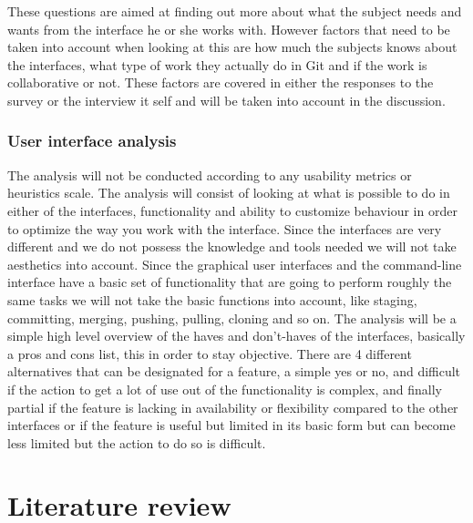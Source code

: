 \documentclass[a4paper,oneside]{bth} %
\begin{document}
						These questions are aimed at finding out more about what the subject needs and wants from the interface he or she works with. However factors that need to be taken into account when looking at this are how much the subjects knows about the interfaces, what type of work they actually do in Git and if the work is collaborative or not. These factors are covered in either the responses to the survey or the interview it self and will be taken into account in the discussion.
				\subsection{User interface analysis}
				The analysis will not be conducted according to any usability metrics or heuristics scale. The analysis will consist of looking at what is possible to do in either of the interfaces, functionality and ability to customize behaviour in order to optimize the way you work with the interface. Since the interfaces are very different and we do not possess the knowledge and tools needed we will not take aesthetics into account. Since the graphical user interfaces and the command-line interface have a basic set of functionality that are going to perform roughly the same tasks we will not take the basic functions into account, like staging, committing, merging, pushing, pulling, cloning and so on.
				The analysis will be a simple high level overview of the haves and don't-haves of the interfaces, basically a pros and cons list, this in order to stay objective. There are 4 different alternatives that can be designated for a feature, a simple yes or no, and difficult if the action to get a lot of use out of the functionality is complex, and finally partial if the feature is lacking in availability or flexibility compared to the other interfaces or if the feature is useful but limited in its basic form but can become less limited but the action to do so is difficult.
		
		\chapter{Literature review}
		
\end{document}
